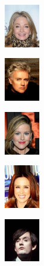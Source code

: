 \documentclass{article}
\begin{document}
\begin{enumerate}
\begin{enumerate}
\begin{figure}[h!]
\begin{minipage}{0.8\textwidth}
						\begin{subfigure}[b]{0.18\textwidth}
							\centering
							\includegraphics[height=1.9cm]{000018}
						\end{subfigure}
						\hfill
						\begin{subfigure}[b]{0.18\textwidth}
							\centering
							\includegraphics[height=1.9cm]{000030}
						\end{subfigure}
						\hfill
						\begin{subfigure}[b]{0.18\textwidth}
							\centering
							\includegraphics[height=1.9cm]{000042}
						\end{subfigure}
						\hfill
						\begin{subfigure}[b]{0.18\textwidth}
							\centering
							\includegraphics[height=1.9cm]{000045}
						\end{subfigure}
						\hfill
						\begin{subfigure}[b]{0.18\textwidth}
							\centering
							\includegraphics[height=1.9cm]{000048}
						\end{subfigure}

						\vspace{0.6cm} %


\end{minipage}
\end{figure}
\end{enumerate}
\end{enumerate}
\end{document}
